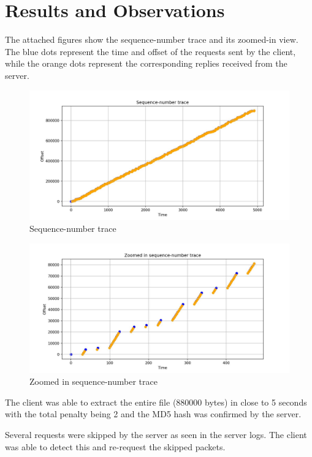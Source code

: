 \documentclass[12pt, a4paper]{article}
\begin{document}
\section{Results and Observations}
The attached figures show the sequence-number trace and its zoomed-in view. The blue dots represent the time and offset of the requests sent by the client, while the orange dots represent the corresponding replies received from the server.

\begin{figure}[h]
\centering
\includegraphics[width=0.9\linewidth]{Sequence-number trace.jpeg}
\caption{Sequence-number trace}
\label{fig:sequence_trace}
\end{figure}

\begin{figure}[h]
\centering
\includegraphics[width=0.9\linewidth]{Zoomed in sequence-number trace.jpeg}
\caption{Zoomed in sequence-number trace}
\label{fig:zoomed_trace}
\end{figure}

The client was able to extract the entire file (880000 bytes) in close to 5 seconds with the total penalty being 2 and the MD5 hash was confirmed by the server.
\newline


Several requests were skipped by the server as seen in the server logs. The client was able to detect this and re-request the skipped packets.
\end{document}
